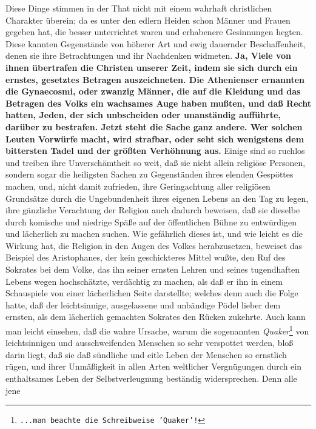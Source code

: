 {Diese Dinge stimmen in der That nicht mit einem wahrhaft christlichen Charakter
überein; da es unter den edlern Heiden schon Männer und
Frauen gegeben hat, die
besser unterrichtet waren und erhabenere Gesinnungen hegten. Diese kannten
Gegenstände von höherer Art und ewig dauernder Beschaffenheit, denen sie ihre
Betrachtungen und ihr Nachdenken widmeten. \textbf{Ja,
Viele von ihnen übertrafen die
Christen unserer Zeit, indem sie sich durch ein ernstes, gesetztes Betragen
auszeichneten. Die Athenienser ernannten die Gynaecosmi, oder zwanzig Männer,
die auf die Kleidung und das Betragen des Volks ein wachsames Auge haben mußten,
und daß Recht hatten, Jeden, der sich unbscheiden oder unanständig aufführte,
darüber zu bestrafen. Jetzt steht die Sache ganz andere. Wer solchen Leuten
Vorwürfe macht, wird strafbar, oder seht sich wenigstens dem bittersten Tadel
und der größten Verhöhnung aus.} Einige sind so ruchlos und treiben ihre
Unverschämtheit so weit, daß sie nicht allein religiöse Personen, sondern sogar
die heiligsten Sachen zu Gegenständen ihres elenden Gespöttes machen, und, nicht
damit zufrieden, ihre Geringachtung aller religiösen Grundsätze durch die
Ungebundenheit ihres eigenen Lebens an den Tag zu legen, ihre gänzliche
Verachtung der Religion auch dadurch beweisen, daß sie dieselbe durch komische
und niedrige Späße auf der öffentlichen Bühne zu entwürdigen und lächerlich zu
machen suchen. Wie gefährlich dieses ist, und wie leicht es die Wirkung hat, die
Religion in den Augen des Volkes herabzusetzen, beweiset das Beispiel des
Aristophanes, der kein geschickteres Mittel wußte,
den Ruf des Sokrates bei dem
Volke, das ihn seiner ernsten Lehren und seines tugendhaften Lebens wegen
hochschätzte, verdächtig zu machen, als daß er ihn in einem Schauspiele von
einer lächerlichen Seite darstellte; welches denn auch die Folge hatte, daß der
leichtsinnige, ausgelassene und unbändige Pödel lieber
dem ernsten, als dem
lächerlich gemachten Sokrates den Rücken zukehrte. Auch kann man leicht
einsehen, daß die wahre Ursache, warum die sogenannten
\textit{Quaker}\footnote{\texttt{...man beachte die Schreibweise
'Quaker'!}} von
leichtsinnigen und ausschweifenden Menschen so sehr verspottet werden, bloß
darin liegt, daß sie daß sündliche und eitle Leben der Menschen so ernstlich
rügen, und ihrer Unmäßigkeit in allen Arten weltlicher Vergnügungen durch ein
enthaltsames Leben der Selbstverleugnung beständig widersprechen. Denn alle jene
}
